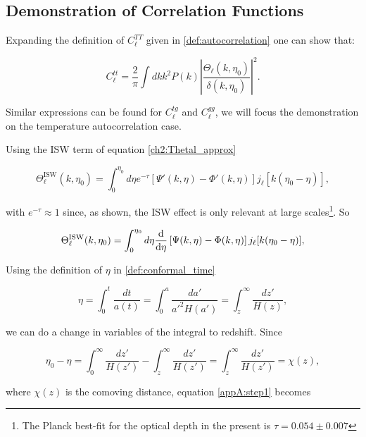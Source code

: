 \documentclass[openany,a4paper,12pt,oneside]{book}
\begin{document}
\begin{spacing}{1.5}
\chapter{Demonstration of Correlation Functions}\label{app:correlations_demo}

Expanding the definition of $C_\ell^{TT}$ given in \eqref{def:autocorrelation} one can show that\cite{dodelson2020modern}:

\begin{equation}\label{demo:Start_eq}
	C_\ell^{tt}=\frac{2}{\pi}\int dk k^2P(k)\left|\frac{\Theta_\ell(k,\eta_0)}{\delta(k,\eta_0)}\right|^2.
\end{equation}

Similar expressions can be found for $C_\ell^{tg}$ and $C_\ell^{gg}$, we will focus the demonstration on the temperature autocorrelation case.

Using the ISW term of equation \eqref{ch2:Thetal_approx}

\begin{equation}
	\Theta_\ell^{\text{ISW}}(k,\eta_0)=\int_0^{\eta_0} d\eta e^{-\tau}[\Psi'(k,\eta)-\Phi'(k,\eta)]j_\ell[k(\eta_0-\eta)],
\end{equation}

\noindent with $e^{-\tau}\approx 1$ since, as shown, the ISW effect is only relevant at large scales\footnote{The Planck best-fit for the optical depth in the present is $\tau=0.054\pm 0.007$}. So

\begin{equation}\label{appA:step1}
	\Theta_\ell^{\text{ISW}}(k,\eta_0)=\int_0^{\eta_0} d\eta \dv{}{\eta}\left[\Psi(k,\eta)-\Phi(k,\eta)\right]j_\ell[k(\eta_0-\eta)],
\end{equation}

Using the definition of $\eta$ in \eqref{def:conformal_time}

\begin{equation}
	\eta=\int_0^t \frac{dt}{a(t)}=\int_0^a\frac{da'}{a'^2H(a')}=\int_{z}^\infty \frac{dz'}{H(z)},
\end{equation}

\noindent we can do a change in variables of the integral to redshift. Since

\begin{equation}
	\eta_0-\eta=\int_0^\infty \frac{dz'}{H(z')}-\int_z^\infty \frac{dz'}{H(z')}=\int_z^\infty \frac{dz'}{H(z')}=\chi(z),
\end{equation}

\noindent where $\chi(z)$ is the comoving distance, equation \eqref{appA:step1} becomes


\end{spacing}
\end{document}
